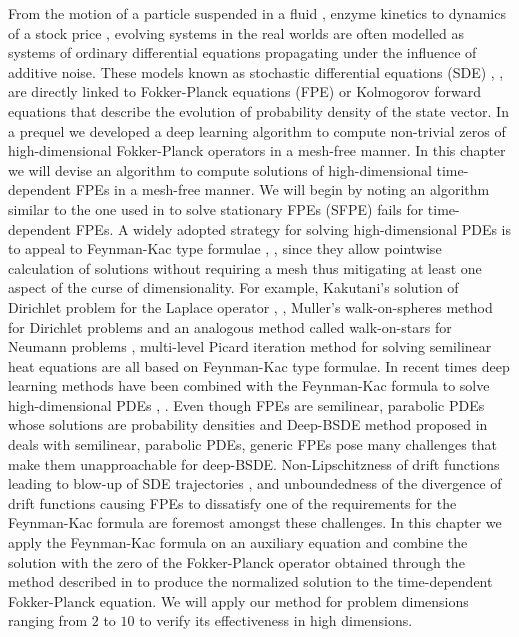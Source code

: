 From the motion of a particle suspended in a fluid \cite{karatzas1991brownian},  enzyme kinetics \cite{allen2010introduction} to dynamics of a stock price \cite{karoui1997non}, \cite{delong2013backward} evolving systems in the real worlds are often modelled as systems of ordinary differential equations propagating under the influence of additive noise. These models known as stochastic differential equations (SDE) \cite{oksendal2003stochastic}, \cite{gardiner2009stochastic}, \cite{strauss2017hitch} are directly linked to Fokker-Planck equations (FPE) \cite{risken1996fokker} or Kolmogorov forward equations that describe the evolution of probability density of the state vector. In a prequel \cite{mandal2023learning} we developed a deep learning algorithm to compute non-trivial zeros of high-dimensional Fokker-Planck operators in a mesh-free manner. In this chapter we will devise an algorithm to compute solutions of high-dimensional time-dependent FPEs in a mesh-free manner. We will begin by noting an algorithm similar to the one used in \cite{mandal2023learning} to solve stationary FPEs (SFPE) fails for time-dependent FPEs. A widely adopted strategy for solving high-dimensional PDEs is to appeal to Feynman-Kac type formulae \cite{del2004feynman}, \cite{jefferies2013evolution}, since they allow pointwise calculation of solutions without requiring a mesh thus mitigating at least one aspect of the curse of dimensionality. For example, Kakutani's solution of Dirichlet problem for the Laplace operator \cite{kakutani1944131}, \cite{kakutani1944143}, Muller's walk-on-spheres method for Dirichlet problems \cite{muller1956some} and an analogous method called walk-on-stars for Neumann problems \cite{sawhney2023walk}, multi-level Picard iteration method for solving semilinear heat equations \cite{hutzenthaler2021multilevel} are all based on Feynman-Kac type formulae. In recent times  deep learning methods have been combined with the Feynman-Kac formula to solve high-dimensional PDEs \cite{han2018solving}, \cite{blechschmidt2021three}. Even though FPEs are semilinear, parabolic PDEs whose solutions are probability densities and Deep-BSDE method proposed in \cite{han2018solving} deals with semilinear, parabolic PDEs, generic FPEs pose many challenges that make them unapproachable for deep-BSDE. Non-Lipschitzness of drift functions leading to blow-up of SDE trajectories \cite{chow2014almost}, \cite{li2011lack} and unboundedness of the divergence of drift functions causing FPEs to dissatisfy one of the requirements for the Feynman-Kac formula are foremost amongst these challenges. In this chapter we apply the Feynman-Kac formula on an auxiliary equation and combine the solution with the zero of the Fokker-Planck operator obtained through the method described in \cite{mandal2023learning} to produce the normalized solution to the time-dependent Fokker-Planck equation.  We will apply our method for problem dimensions ranging from $2$ to $10$ to verify its effectiveness in high dimensions.


